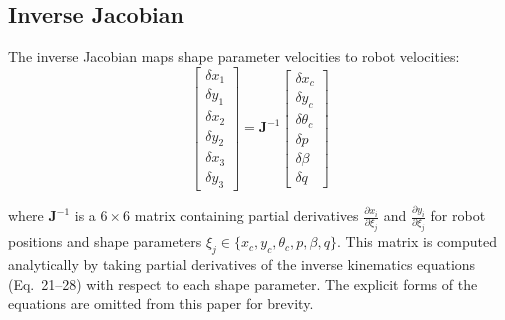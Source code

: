 \documentclass[lettersize,journal]{IEEEtran}
\begin{document}
\subsection{Inverse Jacobian}

The inverse Jacobian maps shape parameter velocities to robot velocities:
\begin{equation}
\begin{bmatrix}
\delta x_1 \\ \delta y_1 \\ \delta x_2 \\ \delta y_2 \\ \delta x_3 \\ \delta y_3
\end{bmatrix} =
\mathbf{J}^{-1}
\begin{bmatrix}
\delta x_c \\ \delta y_c \\ \delta \theta_c \\ \delta p \\ \delta \beta \\ \delta q
\end{bmatrix}
\end{equation}

where $\mathbf{J}^{-1}$ is a $6 \times 6$ matrix containing partial derivatives $\frac{\partial x_i}{\partial \xi_j}$ and $\frac{\partial y_i}{\partial \xi_j}$ for robot positions and shape parameters $\xi_j \in \{x_c, y_c, \theta_c, p, \beta, q\}$. This matrix is computed analytically by taking partial derivatives of the inverse kinematics equations (Eq.~21--28) with respect to each shape parameter. The explicit forms of the equations are omitted from this paper for brevity.
\end{document}

